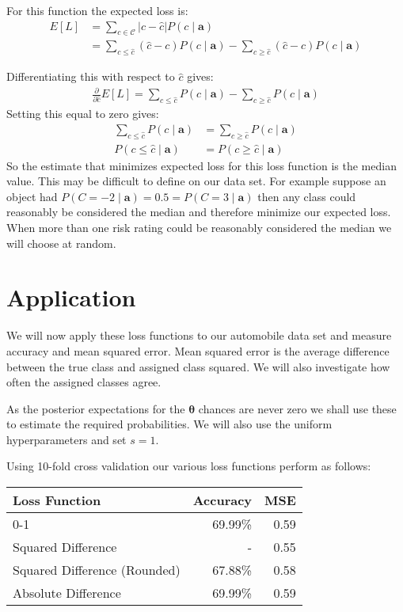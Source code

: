 For this function the expected loss is:
\begin{align}
	E[L] & = \sum_{c \in \mathcal{C}} |c - \hat{c}|P(c \mid \mathbf{a}) \\
	     & = \sum_{c \leq \hat{c}} (\hat{c} - c)P(c \mid \mathbf{a}) - \sum_{c \geq \hat{c}} (\hat{c} - c)P(c \mid \mathbf{a})
\end{align}

Differentiating this with respect to $\hat{c}$ gives:
\begin{align}
	\frac{\partial}{\partial \hat{c}} E[L] = \sum_{c \leq \hat{c}} P(c \mid \mathbf{a}) - \sum_{c \geq \hat{c}} P(c \mid \mathbf{a})
\end{align}
Setting this equal to zero gives:
\begin{align}
	\sum_{c \leq \hat{c}} P(c \mid \mathbf{a}) & = \sum_{c \geq \hat{c}} P(c \mid \mathbf{a}) \\
	P(c \leq \hat{c} \mid \mathbf{a}) & = P(c \geq \hat{c} \mid \mathbf{a})
\end{align}
So the estimate that minimizes expected loss for this loss function is the median value.
This may be difficult to define on our data set.
For example suppose an object had $P(C = -2 \mid \mathbf{a}) = 0.5 = P(C=3 \mid \mathbf{a})$ then any class could reasonably be considered the median and therefore minimize our expected loss.
When more than one risk rating could be reasonably considered the median we will choose at random.

\section{Application}
We will now apply these loss functions to our automobile data set and measure accuracy and mean squared error.
Mean squared error is the average difference between the true class and assigned class squared.
We will also investigate how often the assigned classes agree.

As the posterior expectations for the $\bm{\theta}$ chances are never zero we shall use these to estimate the required probabilities.
We will also use the uniform hyperparameters and set $s=1$.

Using 10-fold cross validation our various loss functions perform as follows:

\begin{center}
	\begin{tabular}{l r r}
		\hline
		Loss Function                & Accuracy & MSE  \\
		\hline
		0-1                          & 69.99\%  & 0.59 \\
		Squared Difference           & -        & 0.55 \\
		Squared Difference (Rounded) & 67.88\%  & 0.58 \\
		Absolute Difference          & 69.99\%  & 0.59 \\
		\hline
	\end{tabular}
\end{center}

